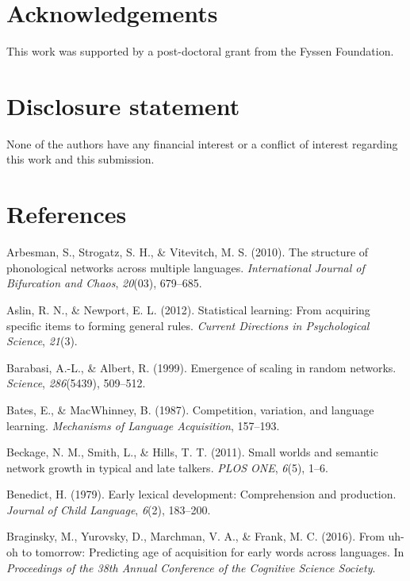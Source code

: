 \documentclass[english,floatsintext,man]{apa6}
\theoremstyle{definition}
\theoremstyle{definition}
\theoremstyle{definition}
\theoremstyle{remark}
\begin{document}
\section{Acknowledgements}\label{acknowledgements}

This work was supported by a post-doctoral grant from the Fyssen
Foundation.

\section{Disclosure statement}\label{disclosure-statement}

None of the authors have any financial interest or a conflict of
interest regarding this work and this submission.

\section{References}\label{references}

\setlength{\parindent}{-0.5in} \setlength{\leftskip}{0.5in}

\hypertarget{refs}{}
\hypertarget{ref-arbesman2010}{}
Arbesman, S., Strogatz, S. H., \& Vitevitch, M. S. (2010). The structure
of phonological networks across multiple languages. \emph{International
Journal of Bifurcation and Chaos}, \emph{20}(03), 679--685.

\hypertarget{ref-aslin2012}{}
Aslin, R. N., \& Newport, E. L. (2012). Statistical learning: From
acquiring specific items to forming general rules. \emph{Current
Directions in Psychological Science}, \emph{21}(3).

\hypertarget{ref-barabasi99}{}
Barabasi, A.-L., \& Albert, R. (1999). Emergence of scaling in random
networks. \emph{Science}, \emph{286}(5439), 509--512.

\hypertarget{ref-bates1987}{}
Bates, E., \& MacWhinney, B. (1987). Competition, variation, and
language learning. \emph{Mechanisms of Language Acquisition}, 157--193.

\hypertarget{ref-beckage2011}{}
Beckage, N. M., Smith, L., \& Hills, T. T. (2011). Small worlds and
semantic network growth in typical and late talkers. \emph{PLOS ONE},
\emph{6}(5), 1--6.

\hypertarget{ref-benedict1979}{}
Benedict, H. (1979). Early lexical development: Comprehension and
production. \emph{Journal of Child Language}, \emph{6}(2), 183--200.

\hypertarget{ref-braginsky2016}{}
Braginsky, M., Yurovsky, D., Marchman, V. A., \& Frank, M. C. (2016).
From uh-oh to tomorrow: Predicting age of acquisition for early words
across languages. In \emph{Proceedings of the 38th Annual Conference of
the Cognitive Science Society}.
\end{document}
